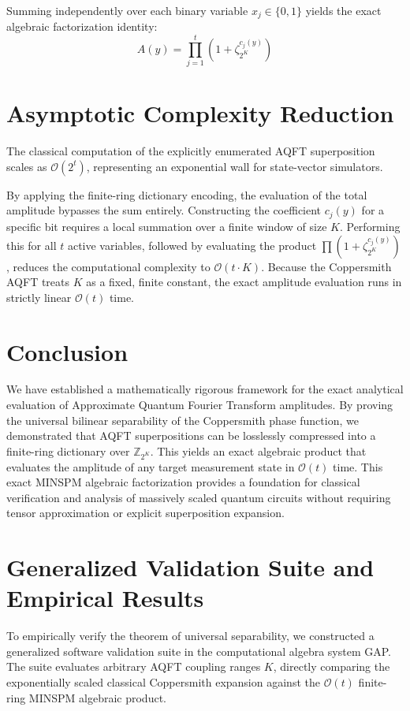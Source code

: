 \documentclass[11pt, a4paper]{article}
\begin{document}
Summing independently over each binary variable $x_j \in \{0, 1\}$ yields the exact algebraic factorization identity:
\begin{equation}
A(y) = \prod_{j=1}^t \left( 1 + \zeta_{2^K}^{c_j(y)} \right)
\end{equation}

\section{Asymptotic Complexity Reduction}
The classical computation of the explicitly enumerated AQFT superposition scales as $\mathcal{O}(2^t)$, representing an exponential wall for state-vector simulators. 

By applying the finite-ring dictionary encoding, the evaluation of the total amplitude bypasses the sum entirely. Constructing the coefficient $c_j(y)$ for a specific bit requires a local summation over a finite window of size $K$. Performing this for all $t$ active variables, followed by evaluating the product $\prod (1 + \zeta_{2^K}^{c_j(y)})$, reduces the computational complexity to $\mathcal{O}(t \cdot K)$. Because the Coppersmith AQFT treats $K$ as a fixed, finite constant, the exact amplitude evaluation runs in strictly linear $\mathcal{O}(t)$ time.

\section{Conclusion}
We have established a mathematically rigorous framework for the exact analytical evaluation of Approximate Quantum Fourier Transform amplitudes. By proving the universal bilinear separability of the Coppersmith phase function, we demonstrated that AQFT superpositions can be losslessly compressed into a finite-ring dictionary over $\mathbb{Z}_{2^K}$. This yields an exact algebraic product that evaluates the amplitude of any target measurement state in $\mathcal{O}(t)$ time. This exact MINSPM algebraic factorization provides a foundation for classical verification and analysis of massively scaled quantum circuits without requiring tensor approximation or explicit superposition expansion.

\newpage
\appendix
\section{Generalized Validation Suite and Empirical Results}
To empirically verify the theorem of universal separability, we constructed a generalized software validation suite in the computational algebra system GAP. The suite evaluates arbitrary AQFT coupling ranges $K$, directly comparing the exponentially scaled classical Coppersmith expansion against the $\mathcal{O}(t)$ finite-ring MINSPM algebraic product.
\end{document}
